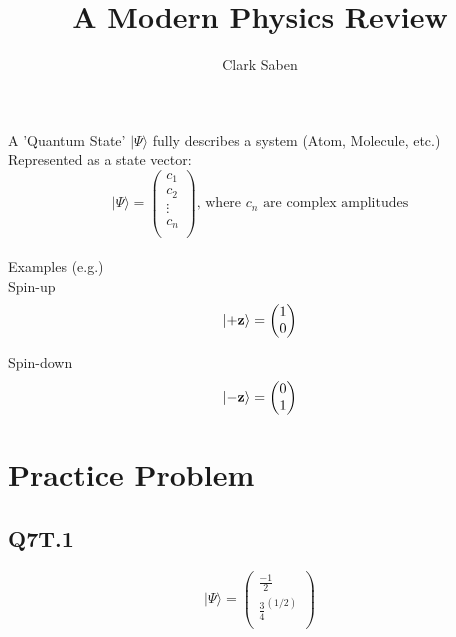 \documentclass{article}
\title{A Modern Physics Review}
\author{Clark Saben}
\begin{document}
\newcommand{\pz}{\ket{\vb{+z}}}
\newcommand{\nz}{\ket{\vb{-z}}}
\newcommand{\px}{\ket{\vb{+x}}}
\newcommand{\nx}{\ket{\vb{-x}}}
\newcommand{\py}{\ket{\vb{+z}}}
\newcommand{\ny}{\ket{\vb{-y}}}

\newcommand{\pxexpr}{ \frac{1}{\sqrt{2}} \pz + \frac{1}{\sqrt{2}} \nz}
\newcommand{\nxexpr}{ \frac{1}{\sqrt{2}} \pz - \frac{1}{\sqrt{2}} \nz}
\newcommand{\pyexpr}{ \frac{1}{\sqrt{2}} \pz + \frac{i}{\sqrt{2}} \nz}
\newcommand{\nyexpr}{ \frac{1}{\sqrt{2}} \pz - \frac{i}{\sqrt{2}} \nz}
\maketitle

A 'Quantum State' $|\Psi\rangle$ fully describes a system (Atom, Molecule, etc.)\\

Represented as a state vector:
\begin{equation*}
	|\Psi\rangle = \begin{pmatrix}
		c_{1} \\
		c_{2} \\
		\vdots \\
		c_{n} \\
	\end{pmatrix}
	\text{, where $c_{n}$ are complex amplitudes}
\end{equation*}\\


Examples (e.g.)\\

Spin-up
$$
\pz = \begin{pmatrix}
	1 \\
	0 \\
\end{pmatrix}
$$

Spin-down
$$
\nz = \begin{pmatrix}
	0 \\
	1 \\
\end{pmatrix}
$$


\section{Practice Problem}
\subsection{Q7T.1}
\begin{equation*}
	|\Psi\rangle = \begin{pmatrix}
		\frac{-1}{2} \\
		\frac{3}{4}^\left({1/2}\right) \\
	\end{pmatrix}
\end{equation*}
\end{document}
